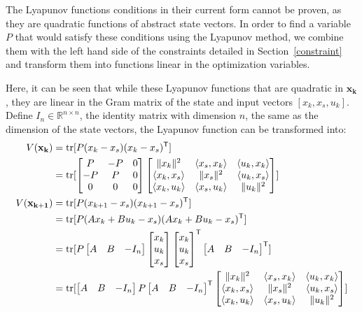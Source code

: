 The Lyapunov functions conditions in their current form cannot be proven, as they are quadratic functions of abstract state vectors. In order to find a variable $P$ that would satisfy these conditions using the Lyapunov method, we combine them with the left hand side of the constraints detailed in Section~\ref{constraint} and transform them into functions linear in the optimization variables.

Here, it can be seen that while these Lyapunov functions that are quadratic in $\mathbf{x_k}$, they are linear in the Gram matrix of the state and input vectors $[x_k, x_s, u_k]$. Define $I_n \in \mathbb{R}^{n \times n}$, the identity matrix with dimension $n$, the same as the dimension of the state vectors, the Lyapunov function can be transformed into:
\begin{subequations}  \label{eqn:Vx}
	\begin{align*}
		V(\mathbf{x_k}) &= \operatorname{\mathrm{tr}}[P(x_k - x_s)(x_k - x_s)^{\mathsf{T}}]\\
					  &= \operatorname{\mathrm{tr}}[\begin{bmatrix}P &-P &0\\-P & P & 0\\0 & 0 & 0\end{bmatrix}\begin{bmatrix}\|x_k\|^2 & \langle x_s, x_k \rangle & \langle u_k, x_k \rangle \\ \langle x_k, x_s \rangle & \|x_s\|^2 & \langle u_k, x_s \rangle \\ \langle x_k, u_k \rangle & \langle x_s, u_k \rangle & \|u_k\|^2\end{bmatrix}]\\
		V(\mathbf{x_{k+1}}) &= \operatorname{\mathrm{tr}}[P(x_{k+1} - x_s)(x_{k+1} - x_s)^{\mathsf{T}}]\\
		&= \operatorname{\mathrm{tr}}[P(Ax_k + Bu_k - x_s)(Ax_k + Bu_k - x_s)^{\mathsf{T}}] \\
		&= \operatorname{\mathrm{tr}}[P\begin{bmatrix}A & B & -I_n\end{bmatrix}\begin{bmatrix}x_k \\ u_k \\ x_s\end{bmatrix}\begin{bmatrix}x_k \\ u_k \\ x_s\end{bmatrix}^{\mathsf{T}}\begin{bmatrix}A & B & -I_n\end{bmatrix}^{\mathsf{T}}]\\
		&= \operatorname{\mathrm{tr}}[\begin{bmatrix}A & B & -I_n\end{bmatrix}P\begin{bmatrix}A & B & -I_n\end{bmatrix}^{\mathsf{T}}\begin{bmatrix}\|x_k\|^2 & \langle x_s, x_k \rangle & \langle u_k, x_k \rangle \\ \langle x_k, x_s \rangle & \|x_s\|^2 & \langle u_k, x_s \rangle \\ \langle x_k, u_k \rangle & \langle x_s, u_k \rangle & \|u_k\|^2\end{bmatrix}]
	\end{align*}
\end{subequations}
